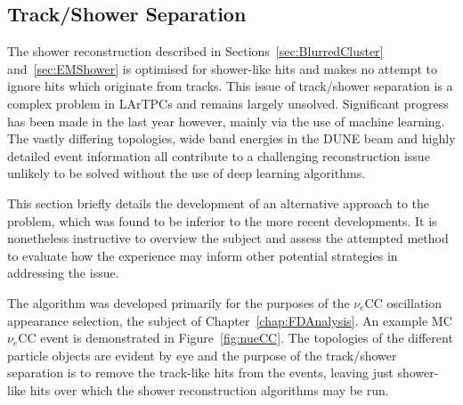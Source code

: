 \subsection{Track/Shower Separation}\label{sec:TrackShowerSeparation}

The shower reconstruction described in Sections~\ref{sec:BlurredCluster} and~\ref{sec:EMShower} is optimised for shower-like hits and makes no attempt to ignore hits which originate from tracks.  This issue of track/shower separation is a complex problem in LArTPCs and remains largely unsolved.  Significant progress has been made in the last year however, mainly via the use of machine learning.  The vastly differing topologies, wide band energies in the DUNE beam and highly detailed event information all contribute to a challenging reconstruction issue unlikely to be solved without the use of deep learning algorithms.

This section briefly details the development of an alternative approach to the problem, which was found to be inferior to the more recent developments.  It is nonetheless instructive to overview the subject and assess the attempted method to evaluate how the experience may inform other potential strategies in addressing the issue.

The algorithm was developed primarily for the purposes of the $\nu_e$CC oscillation appearance selection, the subject of Chapter~\ref{chap:FDAnalysis}.  An example MC $\nu_e$CC event is demonstrated in Figure~\ref{fig:nueCC}.  The topologies of the different particle objects are evident by eye and the purpose of the track/shower separation is to remove the track-like hits from the events, leaving just shower-like hits over which the shower reconstruction algorithms may be run.

